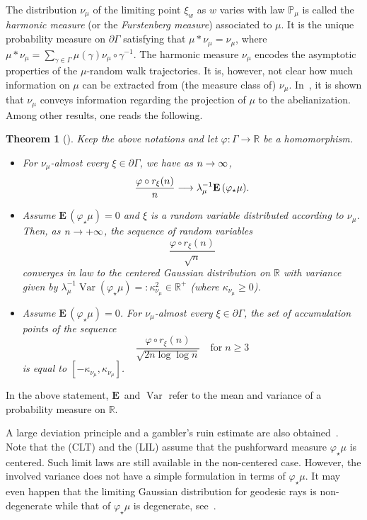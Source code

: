 \documentclass[10pt]{amsart}
\newtheorem{theo}{Theorem}[section]
\theoremstyle{definition}\newtheorem{defi}[theo]{Definition}\newtheorem{rema}[theo]{Remark}\newtheorem{exam}[theo]{Example}\newtheorem{exem}[theo]{Example}\newtheorem{nota}[theo]{Notation}
\DeclareMathOperator{\Var}{Var}
\newcommand{\R}{\mathbb{R}}
\renewcommand{\Pr}{\mathbb{P}}
\newcommand{\Eb}{\mathbf{E}\,}
\renewcommand{\(}{\left(}
\renewcommand{\)}{\right)}
\renewcommand*{\to}{\mathchoice{\longrightarrow}{\rightarrow}{\rightarrow}{\rightarrow}}
\begin{document}
The distribution $\nu_\mu$ of the limiting point $\xi_{w}$ as $w$ varies with law $\Pr_{\mu}$ is called the \emph{harmonic measure} (or the \emph{Furstenberg measure}) associated to $\mu$. It is the unique probability measure on $\partial \Gamma$ satisfying that $\mu\ast \nu_\mu=\nu_\mu$, where $\mu\ast \nu_\mu=\sum_{\gamma \in \Gamma}\mu(\gamma)\nu_\mu\circ \gamma^{-1}$. The harmonic measure $\nu_\mu$ encodes the asymptotic properties of the $\mu$-random walk trajectories. It is, however, not clear how much information on $\mu$ can be extracted from (the measure class of) $\nu_\mu$. In~\cite{BenardWinding}, it is shown that $\nu_{\mu}$ conveys information regarding the projection of $\mu$ to the abelianization. Among other results, one reads the following.



\begin{theo}[{\cite[Theorem~1.4]{BenardWinding}}]\label{Thm:Benard}
Keep the above notations and let $\varphi : \Gamma \rightarrow \R$ be a homomorphism.
\begin{itemize}
\item[(LLN)] For $\nu_\mu$-almost every $\xi \in \partial \Gamma$, we have as $n \to \infty$,
\[
\frac{\varphi \circ r_\xi(n)}{n} \to \lambda_{\mu}^{-1}\Eb(\varphi_{\star}\mu).
\]
\item[(CLT)] Assume $\Eb(\varphi_{\star}\mu)=0$ and $\xi$ is a random variable distributed according to $\nu_\mu$. Then, as $n \to +\infty$, the sequence of random variables
\[
\frac{\varphi\circ r_\xi(n)}{\sqrt{n}}
\]
converges in law to the centered Gaussian distribution on $\R$ with variance given by $\lambda_{\mu}^{-1}\Var(\varphi_{\star}\mu)=:\kappa^2_{\nu_\mu}\in \R^+$ (where $\kappa_{\nu_\mu}\geq 0$).

\item[(LIL)] Assume $\Eb(\varphi_{\star}\mu)=0$. For $\nu_\mu$-almost every $\xi \in \partial \Gamma$, the set of accumulation points of the sequence
\[
\frac{\varphi\circ r_\xi(n)}{\sqrt{2n\log \log n}} \quad \text{for}\; n\geq 3
\]
is equal to $[-\kappa_{\nu_\mu}, \kappa_{\nu_\mu}]$.
\end{itemize}
\end{theo}

In the above statement, $\Eb$ and $\Var$ refer to the mean and variance of a probability measure on $\R$.

A large deviation principle and a gambler's ruin estimate are also obtained~\cite[Theorem~1.4]{BenardWinding}. Note that the (CLT) and the (LIL) assume that the pushforward measure $\varphi_{\star}\mu$ is centered. Such limit laws are still available in the non-centered case. However, the involved variance does not have a simple formulation in terms of $\varphi_{\star}\mu$. It may even happen that the limiting Gaussian distribution for geodesic rays is non-degenerate while that of $\varphi_{\star}\mu$ is degenerate, see~\cite[Lemma~4.2]{BenardWinding}.
\end{document}

